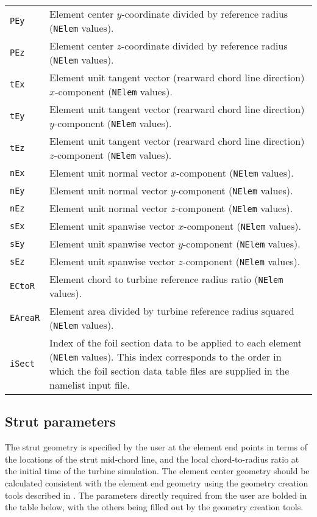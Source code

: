 \begin{longtable}{p{}p{}}
\texttt{PEy}     & Element center $y$-coordinate divided by reference radius (\texttt{NElem} values). \\
\texttt{PEz}     & Element center $z$-coordinate divided by reference radius (\texttt{NElem} values). \\
\texttt{tEx}     & Element unit tangent vector (rearward chord line direction) $x$-component (\texttt{NElem} values). \\
\texttt{tEy}     & Element unit tangent vector (rearward chord line direction) $y$-component (\texttt{NElem} values). \\
\texttt{tEz}     & Element unit tangent vector (rearward chord line direction) $z$-component (\texttt{NElem} values). \\
\texttt{nEx}     & Element unit normal vector $x$-component (\texttt{NElem} values). \\
\texttt{nEy}     & Element unit normal vector $y$-component (\texttt{NElem} values). \\
\texttt{nEz}     & Element unit normal vector $z$-component (\texttt{NElem} values). \\
\texttt{sEx}     & Element unit spanwise vector $x$-component (\texttt{NElem} values). \\
\texttt{sEy}     & Element unit spanwise vector $y$-component (\texttt{NElem} values). \\
\texttt{sEz}     & Element unit spanwise vector $z$-component (\texttt{NElem} values). \\
\texttt{ECtoR}   & Element chord to turbine reference radius ratio (\texttt{NElem}  values). \\
\texttt{EAreaR}  & Element area divided by turbine reference radius squared (\texttt{NElem} values). \\
\texttt{iSect}   & Index of the foil section data to be applied to each element (\texttt{NElem} values). This index corresponds to the order in which the foil section data table files are supplied in the namelist input file. \\ \bottomrule
 
\end{longtable}

\subsection{Strut parameters}
The strut geometry is specified by the user at the element end points in terms of the locations of the strut mid-chord line, and the local chord-to-radius ratio at the initial time of the turbine simulation. The element center geometry should be calculated consistent with the element end geometry using the geometry creation tools described in . The parameters directly required from the user are bolded in the table below, with the others being filled out by the geometry creation tools.

